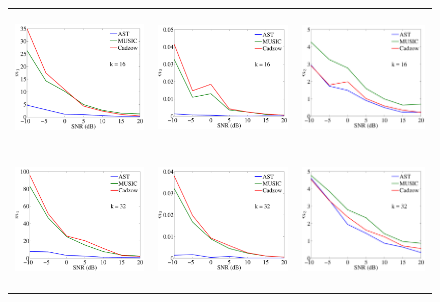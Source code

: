 \begin{figure}[htbp]
\begin{tabular}{ccc}
	\includegraphics[height=35mm]{figures/mSNR1_16.pdf} &
	\includegraphics[height=35mm]{figures/mSNR2_16.pdf} &
	\includegraphics[height=35mm]{figures/mSNR3_16.pdf} \\
	\includegraphics[height=35mm]{figures/mSNR1_32.pdf} &
	\includegraphics[height=35mm]{figures/mSNR2_32.pdf} &
	\includegraphics[height=35mm]{figures/mSNR3_32.pdf} \\

\end{tabular}
\end{figure}
